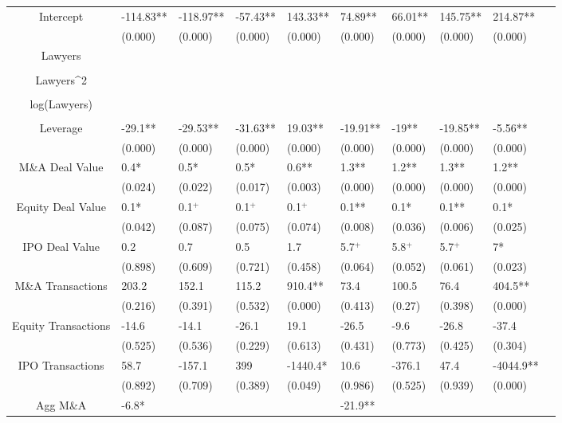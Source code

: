 \documentclass{article}
\begin{document}
\begin{table}[H]
\begin{tabular}{|clllllllll|}
Intercept & -114.83** & -118.97** & -57.43** & 143.33** & 74.89** & 66.01** & 145.75** & 214.87** & \\
   & (0.000) & (0.000) & (0.000) & (0.000) & (0.000) & (0.000) & (0.000) & (0.000) & \\
  Lawyers &  &  &  &  &  &  &  &  & \\
   &  &  &  &  &  &  &  &  & \\
  Lawyers^2 &  &  &  &  &  &  &  &  & \\
   &  &  &  &  &  &  &  &  & \\
  log(Lawyers) &  &  &  &  &  &  &  &  & \\
   &  &  &  &  &  &  &  &  & \\
  Leverage & -29.1** & -29.53** & -31.63** & 19.03** & -19.91** & -19** & -19.85** & -5.56** & \\
   & (0.000) & (0.000) & (0.000) & (0.000) & (0.000) & (0.000) & (0.000) & (0.000) & \\
  M\&A Deal Value & 0.4* & 0.5* & 0.5* & 0.6** & 1.3** & 1.2** & 1.3** & 1.2** & \\
   & (0.024) & (0.022) & (0.017) & (0.003) & (0.000) & (0.000) & (0.000) & (0.000) & \\
  Equity Deal Value & 0.1* & 0.1$^{+}$ & 0.1$^{+}$ & 0.1$^{+}$ & 0.1** & 0.1* & 0.1** & 0.1* & \\
   & (0.042) & (0.087) & (0.075) & (0.074) & (0.008) & (0.036) & (0.006) & (0.025) & \\
  IPO Deal Value & 0.2 & 0.7 & 0.5 & 1.7 & 5.7$^{+}$ & 5.8$^{+}$ & 5.7$^{+}$ & 7* & \\
   & (0.898) & (0.609) & (0.721) & (0.458) & (0.064) & (0.052) & (0.061) & (0.023) & \\
  M\&A Transactions & 203.2 & 152.1 & 115.2 & 910.4** & 73.4 & 100.5 & 76.4 & 404.5** & \\
   & (0.216) & (0.391) & (0.532) & (0.000) & (0.413) & (0.27) & (0.398) & (0.000) & \\
  Equity Transactions & -14.6 & -14.1 & -26.1 & 19.1 & -26.5 & -9.6 & -26.8 & -37.4 & \\
   & (0.525) & (0.536) & (0.229) & (0.613) & (0.431) & (0.773) & (0.425) & (0.304) & \\
  IPO Transactions & 58.7 & -157.1 & 399 & -1440.4* & 10.6 & -376.1 & 47.4 & -4044.9** & \\
   & (0.892) & (0.709) & (0.389) & (0.049) & (0.986) & (0.525) & (0.939) & (0.000) & \\
  Agg M\&A & -6.8* &  &  &  & -21.9** &  &  &  & \\

\end{tabular}
\end{table}
\end{document}
